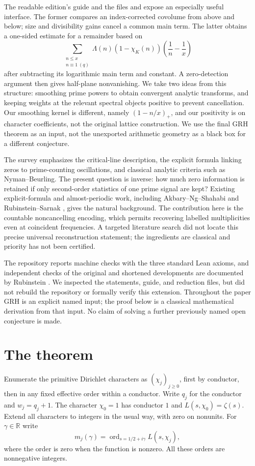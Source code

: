 \documentclass[11pt]{article}
\theoremstyle{remark}\newtheorem{remark}[theorem]{Remark}
\newcommand{\R}{\mathbb R}\newcommand{\C}{\mathbb C}\newcommand{\N}{\mathbb N}\newcommand{\Z}{\mathbb Z}\newcommand{\Q}{\mathbb Q}
\newcommand{\ord}{\operatorname{ord}}\newcommand{\Rea}{\operatorname{Re}}\newcommand{\e}{\mathrm e}
\begin{document}
The readable edition's guide and the files  and  expose an especially useful interface. The former compares an index-corrected covolume from above and below; size and divisibility gains cancel a common main term. The latter obtains a one-sided estimate for a remainder based on
\[
\sum_{\substack{n\le x\\ n\equiv1\ (q)}}\Lambda(n)(1-\chi_K(n))\left(\frac1n-\frac1x\right)
\]
after subtracting its logarithmic main term and constant. A zero-detection argument then gives half-plane nonvanishing. We take two ideas from this structure: smoothing prime powers to obtain convergent analytic transforms, and keeping weights at the relevant spectral objects positive to prevent cancellation. Our smoothing kernel is different, namely $(1-n/x)_+$, and our positivity is on character coefficients, not the original lattice construction. We use the final GRH theorem as an input, not the unexported arithmetic geometry as a black box for a different conjecture.

The survey \cite{wiki} emphasizes the critical-line description, the explicit formula linking zeros to prime-counting oscillations, and classical analytic criteria such as Nyman--Beurling. The present question is inverse: how much zero information is retained if only second-order statistics of one prime signal are kept? Existing explicit-formula and almost-periodic work, including Akbary--Ng--Shahabi \cite{ans} and Rubinstein--Sarnak \cite{rs}, gives the natural background. The contribution here is the countable noncancelling encoding, which permits recovering labelled multiplicities even at coincident frequencies. A targeted literature search did not locate this precise universal reconstruction statement; the ingredients are classical and priority has not been certified.

The repository reports machine checks with the three standard Lean axioms, and independent checks of the original and shortened developments are documented by Rubinstein \cite{rub}. We inspected the statements, guide, and reduction files, but did not rebuild the repository or formally verify this extension. Throughout the paper GRH is an explicit named input; the proof below is a classical mathematical derivation from that input. No claim of solving a further previously named open conjecture is made.

\section{The theorem}
Enumerate the primitive Dirichlet characters as $(\chi_j)_{j\ge0}$, first by conductor, then in any fixed effective order within a conductor. Write $q_j$ for the conductor and $w_j=q_j+1$. The character $\chi_0=1$ has conductor $1$ and $L(s,\chi_0)=\zeta(s)$. Extend all characters to integers in the usual way, with zero on nonunits. For $\gamma\in\R$ write
\[
m_j(\gamma)=\ord_{s=1/2+i\gamma}L(s,\chi_j),
\]
where the order is zero when the function is nonzero. All these orders are nonnegative integers.
\end{document}
